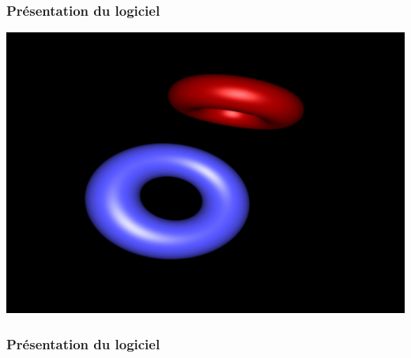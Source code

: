 \documentclass{beamer}
\begin{document}
%
\begin{frame}
\frametitle{Présentation du logiciel}

\centering
\includegraphics[scale=0.3]{logiciel1.png}

\end{frame}

%
\begin{frame}
\frametitle{Présentation du logiciel}

\centering
{}

\end{frame}


\end{document}
